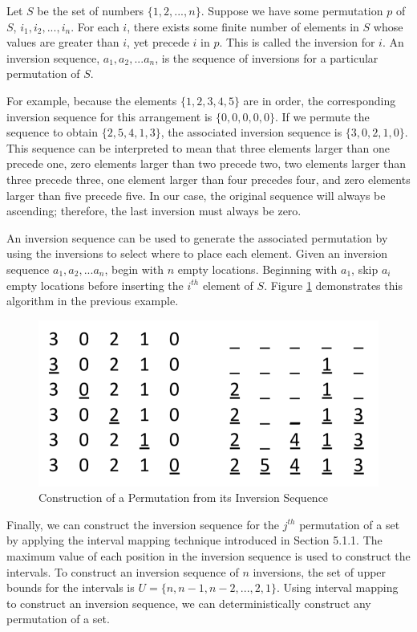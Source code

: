 Let $S$ be the set of numbers $\{1, 2, ..., n\}$. Suppose we have some permutation $p$ of $S$, $i_1, i_2, ..., i_n$. For each $i$, there exists some finite number of elements in $S$ whose values are greater than $i$, yet precede $i$ in $p$. This is called the inversion for $i$. An inversion sequence, $a_1, a_2, ... a_n$, is the sequence of inversions for a particular permutation of $S$.

For example, because the elements $\{1, 2, 3, 4, 5\}$ are in order, the corresponding inversion sequence for this arrangement is $\{0, 0, 0, 0, 0\}$. If we permute the sequence to obtain $\{2, 5, 4, 1, 3\}$, the associated inversion sequence is $\{3, 0, 2, 1, 0\}$. This sequence can be interpreted to mean that three elements larger than one precede one, zero elements larger than two precede two, two elements larger than three precede three, one element larger than four precedes four, and zero elements larger than five precede five. In our case, the original sequence will always be ascending; therefore, the last inversion must always be zero.

An inversion sequence can be used to generate the associated permutation by using the inversions to select where to place each element. Given an inversion sequence $a_1, a_2, ... a_n$, begin with $n$ empty locations. Beginning with $a_1$, skip $a_i$ empty locations before inserting the $i^{th}$ element of $S$. Figure \ref{fig:inversion_sequence} demonstrates this algorithm in the previous example.

\begin{figure}[b]
\centering
\centerline{\includegraphics[origin=c,width=12cm]{../figures/inversion-sequence.png}}
\caption{Construction of a Permutation from its Inversion Sequence}
\label{fig:inversion_sequence}
\end{figure}

Finally, we can construct the inversion sequence for the $j^{th}$ permutation of a set by applying the interval mapping technique introduced in Section 5.1.1. The maximum value of each position in the inversion sequence is used to construct the intervals. To construct an inversion sequence of $n$ inversions, the set of upper bounds for the intervals is $U = \{n, n - 1, n - 2, ..., 2, 1\}$. Using interval mapping to construct an inversion sequence, we can deterministically construct any permutation of a set.

